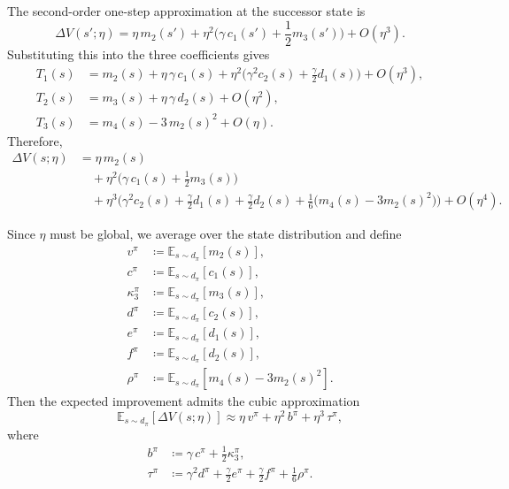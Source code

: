 \documentclass[11pt]{article}
\theoremstyle{definition}
\theoremstyle{remark}
\newcommand{\E}{\mathbb{E}}
\begin{document}
The second-order one-step approximation at the successor state is
\begin{equation}
  \Delta V(s';\eta)
  =
  \eta\,m_2(s')
  + \eta^2\Big(\gamma\,c_1(s') + \frac{1}{2}m_3(s')\Big)
  + O(\eta^3).
\end{equation}
Substituting this into the three coefficients gives
\begin{align}
  T_1(s)
  &= m_2(s)
   + \eta\,\gamma\,c_1(s)
   + \eta^2\Big(\gamma^2 c_2(s) + \frac{\gamma}{2}d_1(s)\Big)
   + O(\eta^3), \\
  T_2(s)
  &= m_3(s)
   + \eta\,\gamma\,d_2(s)
   + O(\eta^2), \\
  T_3(s)
  &= m_4(s) - 3\,m_2(s)^2 + O(\eta).
\end{align}
Therefore,
\begin{align}
  \Delta V(s;\eta)
  &= \eta\,m_2(s) \nonumber\\
  &\quad + \eta^2\Big(\gamma\,c_1(s) + \frac{1}{2}m_3(s)\Big) \nonumber\\
  &\quad + \eta^3\Big(
      \gamma^2 c_2(s)
      + \frac{\gamma}{2}d_1(s)
      + \frac{\gamma}{2}d_2(s)
      + \frac{1}{6}\big(m_4(s) - 3m_2(s)^2\big)
    \Big)
  + O(\eta^4).
\end{align}

Since $\eta$ must be global, we average over the state distribution and define
\begin{align}
  v^\pi
  &\coloneqq \E_{s\sim d_\pi}[m_2(s)], \\
  c^\pi
  &\coloneqq \E_{s\sim d_\pi}[c_1(s)], \\
  \kappa_3^\pi
  &\coloneqq \E_{s\sim d_\pi}[m_3(s)], \\
  d^\pi
  &\coloneqq \E_{s\sim d_\pi}[c_2(s)], \\
  e^\pi
  &\coloneqq \E_{s\sim d_\pi}[d_1(s)], \\
  f^\pi
  &\coloneqq \E_{s\sim d_\pi}[d_2(s)], \\
  \rho^\pi
  &\coloneqq \E_{s\sim d_\pi}[m_4(s) - 3m_2(s)^2].
\end{align}
Then the expected improvement admits the cubic approximation
\begin{equation}
  \E_{s\sim d_\pi}[\Delta V(s;\eta)]
  \approx
  \eta\,v^\pi
  + \eta^2\,b^\pi
  + \eta^3\,\tau^\pi,
\end{equation}
where
\begin{align}
  b^\pi
  &\coloneqq \gamma\,c^\pi + \frac{1}{2}\kappa_3^\pi, \\
  \tau^\pi
  &\coloneqq \gamma^2 d^\pi
  + \frac{\gamma}{2}e^\pi
  + \frac{\gamma}{2}f^\pi
  + \frac{1}{6}\rho^\pi.
\end{align}
\end{document}
